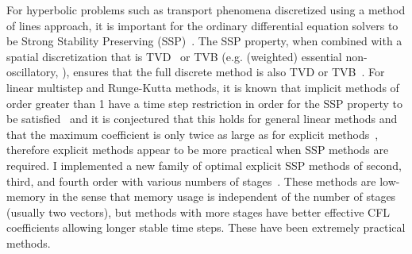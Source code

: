 For hyperbolic problems such as transport phenomena discretized using a method of lines approach, it is important for the ordinary differential equation solvers to be Strong Stability Preserving (SSP)~\citep{gottlieb2009high}.
The SSP property, when combined with a spatial discretization that is TVD~\citep{leveque2002finite} or TVB (e.g. (weighted) essential non-oscillatory, \citet{shu2003high}), ensures that the full discrete method is also TVD or TVB~\citep{gottlieb2001ssp}.
For linear multistep and Runge-Kutta methods, it is known that implicit methods of order greater than 1 have a time step restriction in order for the SSP property to be satisfied~\citep{spijker1983contractivity} and it is conjectured that this holds for general linear methods and that the maximum coefficient is only twice as large as for explicit methods~\citep{gottlieb2009high}, therefore explicit methods appear to be more practical when SSP methods are required.
I implemented a new family of optimal explicit SSP methods of second, third, and fourth order with various numbers of stages~\citep{ketcheson2008highly}.
These methods are low-memory in the sense that memory usage is independent of the number of stages (usually two vectors), but methods with more stages have better effective CFL coefficients allowing longer stable time steps.
These have been extremely practical methods.
